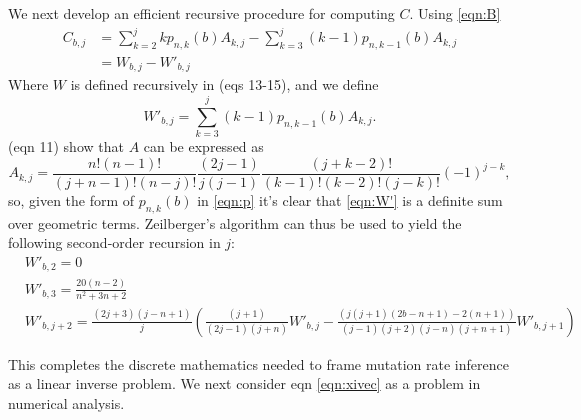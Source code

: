 \documentclass[11pt]{article}
\begin{document}
We next develop an efficient recursive procedure for computing $C$.
Using \ref{eqn:B}
\begin{align*}
C_{b,j} &= \sum_{k=2}^j k p_{n,k}(b) A_{k,j} - \sum_{k=3}^j (k-1) p_{n,k-1}(b) A_{k,j}\\
&= W_{b,j} - W'_{b,j}
\end{align*}
Where $W$ is defined recursively in \cite{Polanski2003-ll} (eqs 13-15), and we define
\begin{equation}
\label{eqn:W'}
W'_{b,j} = \sum_{k=3}^j (k-1) p_{n,k-1}(b) A_{k,j}.
\end{equation}
\cite{Polanski2003-ll} (eqn 11) show that $A$ can be expressed as
\[
A_{k,j} = \frac{n! (n-1)!}{(j+n-1)! (n-j)!} \frac{(2 j-1)}{j (j-1)} \frac{(j+k-2)!}{ (k-1)! (k-2)! (j-k)! }(-1)^{j-k},
\]
so, given the form of $p_{n,k}(b)$ in \ref{eqn:p} it's clear that \ref{eqn:W'} is a definite sum over geometric terms.
Zeilberger's algorithm \citep{petkovvsek1996b, paule1995mathematica} can thus be used to yield the following second-order recursion in $j$:
\begin{align*}
&W'_{b,2} = 0\\
&W'_{b,3} = \frac{20 (n-2)}{n^2+3 n+2}\\
&W'_{b,j+2} = \frac{(2 j+3) (j-n+1)}{j} \left(\frac{(j+1)}{(2 j-1) (j+n)}W'_{b,j}-\frac{(j (j+1) (2 b-n+1)-2 (n+1))}{(j-1) (j+2) (j-n) (j+n+1)}W'_{b,j+1}\right)
\end{align*}

This completes the discrete mathematics needed to frame mutation rate inference as a linear inverse problem.
We next consider eqn \ref{eqn:xivec} as a problem in numerical analysis.
\end{document}
